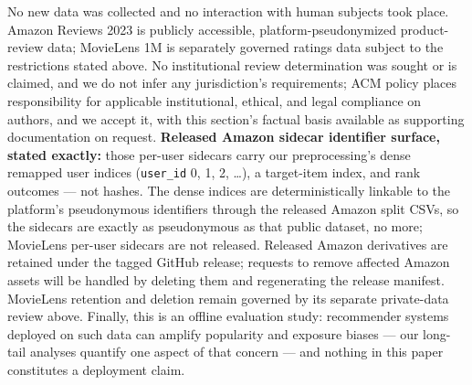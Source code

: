 No new data was collected and no interaction with human subjects took
place. Amazon Reviews 2023 is publicly accessible, platform-pseudonymized product-review data; MovieLens 1M is separately governed ratings data subject to the restrictions stated above. No institutional review determination was sought or is claimed, and we do not infer any jurisdiction's requirements; ACM policy places responsibility for applicable institutional, ethical, and legal compliance on authors, and we accept it, with this section's factual basis available as supporting documentation on request. \textbf{Released Amazon sidecar identifier surface, stated exactly:} those per-user sidecars carry our preprocessing's dense remapped user indices (\texttt{user\_id} 0, 1, 2, \ldots{}), a target-item index, and rank outcomes --- not hashes. The dense indices are deterministically linkable to the platform's pseudonymous identifiers through the released Amazon split CSVs, so the sidecars are exactly as pseudonymous as that public dataset, no more; MovieLens per-user sidecars are not released. Released Amazon derivatives are retained under the tagged GitHub release; requests to remove affected Amazon assets will be handled by deleting them and regenerating the release manifest. MovieLens retention and deletion remain governed by its separate private-data review above. Finally, this is an offline evaluation
study: recommender systems deployed on such data can amplify popularity and exposure biases ---
our long-tail analyses quantify one aspect of that concern --- and nothing in this paper
constitutes a deployment claim.

